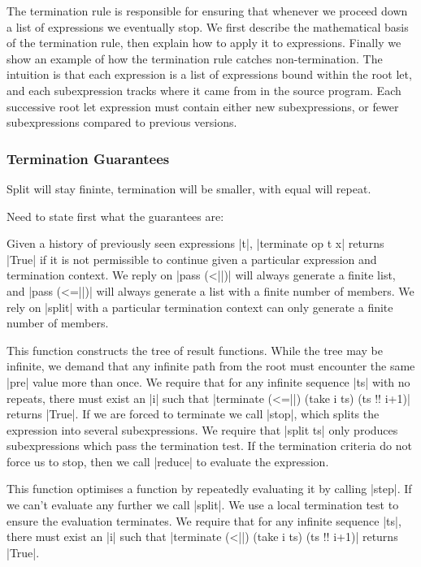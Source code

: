 \documentclass[draft]{sigplanconf}
\begin{document}
The termination rule is responsible for ensuring that whenever we proceed down a list of expressions we eventually stop. We first describe the mathematical basis of the termination rule, then explain how to apply it to expressions. Finally we show an example of how the termination rule catches non-termination. The intuition is that each expression is a list of expressions bound within the root let, and each subexpression tracks where it came from in the source program. Each successive root let expression must contain either new subexpressions, or fewer subexpressions compared to previous versions.

\subsubsection{Termination Guarantees}

Split will stay fininte, termination will be smaller, with equal will repeat.

Need to state first what the guarantees are:

 Given a history of previously seen expressions |t|, |terminate op t x| returns |True| if it is not permissible to continue given a particular expression and termination context. We reply on |pass (<||)| will always generate a finite list, and |pass (<=||)| will always generate a list with a finite number of members. We rely on |split| with a particular termination context can only generate a finite number of members.

 This function constructs the tree of result functions. While the tree may be infinite, we demand that any infinite path from the root must encounter the same |pre| value more than once. We require that for any infinite sequence |ts| with no repeats, there must exist an |i| such that |terminate (<=||) (take i ts) (ts !! i+1)| returns |True|. If we are forced to terminate we call |stop|, which splits the expression into several subexpressions. We require that |split ts| only produces subexpressions which pass the termination test. If the termination criteria do not force us to stop, then we call |reduce| to evaluate the expression.

 This function optimises a function by repeatedly evaluating it by calling |step|. If we can't evaluate any further we call |split|. We use a local termination test to ensure the evaluation terminates. We require that for any infinite sequence |ts|, there must exist an |i| such that |terminate (<||) (take i ts) (ts !! i+1)| returns |True|.
\end{document}
